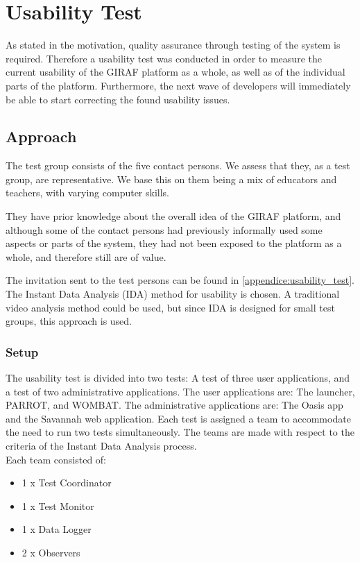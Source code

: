 \section{Usability Test}
\label{common:sec:usability_test}
As stated in the motivation, quality assurance through testing of the system is required. Therefore a usability test was conducted in order to measure the current usability of the GIRAF platform as a whole, as well as of the individual parts of the platform. Furthermore, the next wave of developers will immediately be able to start correcting the found usability issues.

\subsection{Approach}
The test group consists of the five contact persons. We assess that they, as a test group, are representative. We base this on them being a mix of educators and teachers, with varying computer skills.

They have prior knowledge about the overall idea of the GIRAF platform, and although some of the contact persons had previously informally used some aspects or parts of the system, they had not been exposed to the platform as a whole, and therefore still are of value.

The invitation sent to the test persons can be found in \autoref{appendice:usability_test}.\\

The Instant Data Analysis (IDA) method for usability is chosen. A traditional video analysis method could be used, but since IDA is designed for small test groups, this approach is used. \cite{usability:ida}

\subsubsection*{Setup}
The usability test is divided into two tests: A test of three user applications, and a test of two administrative applications. 
The user applications are: The launcher, PARROT, and WOMBAT. The administrative applications are: The Oasis app and the Savannah web application.
Each test is assigned a team to accommodate the need to run two tests simultaneously.
The teams are made with respect to the criteria of the Instant Data Analysis process.\\
Each team consisted of:

\begin{itemize}
	\item 1 x Test Coordinator
	\item 1 x Test Monitor
	\item 1 x Data Logger
	\item 2 x Observers
\end{itemize}

